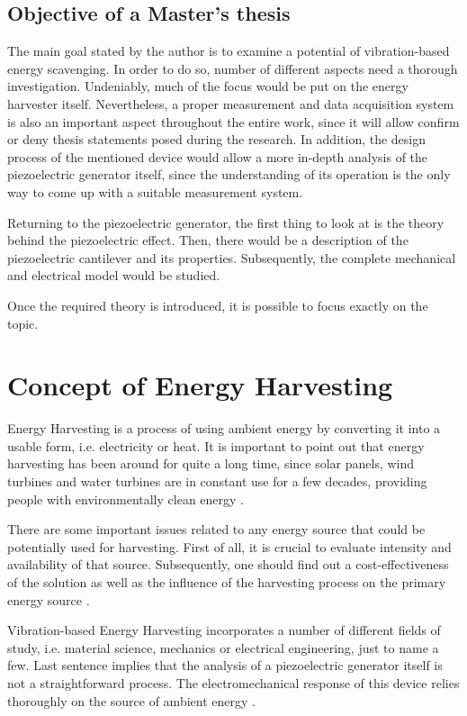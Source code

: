 \documentclass[12pt,a4paper]{article}
\begin{document}
\subsection{Objective of a Master's thesis}
The main goal stated by the author is to examine a potential of vibration-based energy scavenging. In order to do so, number of different aspects need a thorough investigation. Undeniably, much of the focus would be put on the energy harvester itself. Nevertheless, a proper measurement and data acquisition system is also an important aspect throughout the entire work, since it will allow confirm or deny thesis statements posed during the research. In addition, the design process of the mentioned device would allow a more in-depth analysis of the piezoelectric generator itself, since the understanding of its operation is the only way to come up with a suitable measurement system.
\par
Returning to the piezoelectric generator, the first thing to look at is the theory behind the piezoelectric effect. Then, there would be a description of the piezoelectric cantilever  and its properties. Subsequently, the complete mechanical and electrical model would be studied.
\par

Once the required theory is introduced, it is possible to focus exactly on the topic.


\FloatBarrier

\section{Concept of Energy Harvesting}
Energy Harvesting is a process of using ambient energy by converting it into a usable form, i.e. electricity or heat. It is important to point out that energy harvesting has been around for quite a long time, since solar panels, wind turbines and water turbines are in constant use for a few decades, providing people with environmentally clean energy \cite{EnHv1}.
\par

There are some important issues related to any energy source that could be potentially used for harvesting. First of all, it is crucial to evaluate intensity and availability of that source. Subsequently, one should find out a cost-effectiveness of the solution as well as the influence of the harvesting process on the primary energy source \cite{EnHv1}.
\par

Vibration-based Energy Harvesting incorporates a number of different fields of study, i.e. material science, mechanics or electrical engineering, just to name a few. Last sentence implies that the analysis of a piezoelectric generator itself is not a straightforward process. The electromechanical response of this device relies thoroughly on the source of ambient energy \cite{EnHv2}.
\par
\end{document}
